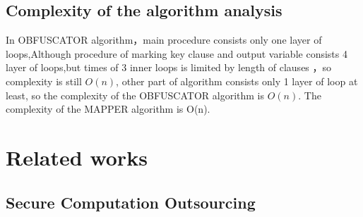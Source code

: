 \documentclass[runningheads,a4paper]{llncs}
\begin{document}
% 
% 
% 
% 
% 
% 

\subsection{Complexity of the algorithm analysis} 

 In OBFUSCATOR algorithm，main procedure consists only one layer of loops,Although procedure of marking key clause and output variable consists 4 layer of loops,but times of 3 inner loops is limited by length of clauses ，so complexity is still $O(n)$, other part of algorithm consists only 1 layer of loop at least, so the complexity of the OBFUSCATOR algorithm is $O (n)$. The complexity of the  MAPPER algorithm is  O(n).
\section{Related works} 
\subsection{Secure Computation Outsourcing}
\end{document}
